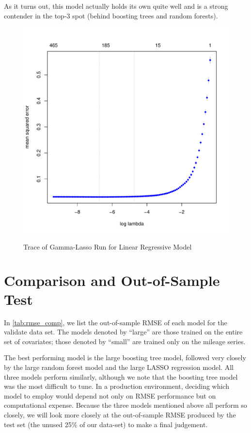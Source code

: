 \documentclass[11pt, fleqn]{article}
\begin{document}
As it turns out, this model actually holds its own quite well and is a strong contender in the top-3 spot (behind boosting trees and random forests).

\begin{figure}[!htb]
  \centering
  \caption{Trace of Gamma-Lasso Run for Linear Regressive Model}
  \includegraphics[scale=.5]{lin_reg_interaction.pdf}
  \label{fig:lin_reg}
\end{figure}

\section{Comparison and Out-of-Sample Test}

In \cref{tab:rmse_comp}, we list the out-of-sample RMSE of each model for the validate data set. The models denoted by ``large'' are those trained on the entire set of covariates; those denoted by ``small'' are trained only on the mileage series.

The best performing model is the large boosting tree model, followed very closely by the large random forest model and the large LASSO regression model. All three models perform similarly, although we note that the boosting tree model was the most difficult to tune. In a production environment, deciding which model to employ would depend not only on RMSE performance but on computational expense. Because the three models mentioned above all perform so closely, we will look more closely at the out-of-sample RMSE produced by the test set (the unused 25\% of our data-set) to make a final judgement.
\end{document}
